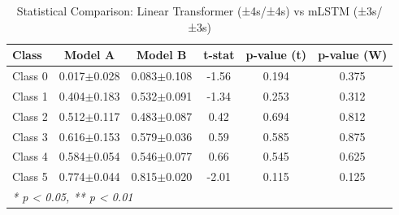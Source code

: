 \begin{table}[htbp]
\centering
\caption{Statistical Comparison: Linear Transformer (±4s/±4s) vs mLSTM (±3s/±3s)}
\label{tab:comparison_class_linear_transformer_±4s_±4s_vs_mlstm_±3s_±3s}
\begin{tabular}{lccccc}
\toprule
\textbf{Class} & \textbf{Model A} & \textbf{Model B} & \textbf{t-stat} & \textbf{p-value (t)} & \textbf{p-value (W)} \\
\midrule
Class 0 & 0.017$\pm$0.028 & 0.083$\pm$0.108 & -1.56 & 0.194 & 0.375 \\
Class 1 & 0.404$\pm$0.183 & 0.532$\pm$0.091 & -1.34 & 0.253 & 0.312 \\
Class 2 & 0.512$\pm$0.117 & 0.483$\pm$0.087 & 0.42 & 0.694 & 0.812 \\
Class 3 & 0.616$\pm$0.153 & 0.579$\pm$0.036 & 0.59 & 0.585 & 0.875 \\
Class 4 & 0.584$\pm$0.054 & 0.546$\pm$0.077 & 0.66 & 0.545 & 0.625 \\
Class 5 & 0.774$\pm$0.044 & 0.815$\pm$0.020 & -2.01 & 0.115 & 0.125 \\
\bottomrule
\multicolumn{6}{l}{\textit{* p < 0.05, ** p < 0.01}} \\
\end{tabular}
\end{table}